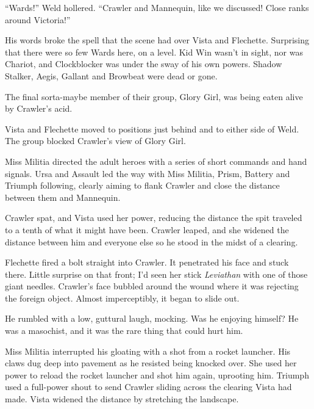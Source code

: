 





``Wards!''  Weld hollered.  ``Crawler and Mannequin, like we discussed!  Close ranks around Victoria!''



His words broke the spell that the scene had over Vista and Flechette.  Surprising that there were so few Wards here, on a level.  Kid Win wasn't in sight, nor was Chariot, and Clockblocker was under the sway of his own powers. Shadow Stalker, Aegis, Gallant and Browbeat were dead or gone.



The final sorta-maybe member of their group, Glory Girl, was being eaten alive by Crawler's acid.



Vista and Flechette moved to positions just behind and to either side of Weld.  The group blocked Crawler's view of Glory Girl.



Miss Militia directed the adult heroes with a series of short commands and hand signals.  Ursa and Assault led the way with Miss Militia, Prism, Battery and Triumph following, clearly aiming to flank Crawler and close the distance between them and Mannequin.



Crawler spat, and Vista used her power, reducing the distance the spit traveled to a tenth of what it might have been.  Crawler leaped, and she widened the distance between him and everyone else so he stood in the midst of a clearing.



Flechette fired a bolt straight into Crawler.  It penetrated his face and stuck there.  Little surprise on that front; I'd seen her stick \emph{Leviathan} with one of those giant needles.  Crawler's face bubbled around the wound where it was rejecting the foreign object.  Almost imperceptibly, it began to slide out.



He rumbled with a low, guttural laugh, mocking.  Was he enjoying himself?  He was a masochist, and it was the rare thing that could hurt him.



Miss Militia interrupted his gloating with a shot from a rocket launcher.  His claws dug deep into pavement as he resisted being knocked over.  She used her power to reload the rocket launcher and shot him again, uprooting him.  Triumph used a full-power shout to send Crawler sliding across the clearing Vista had made.  Vista widened the distance by stretching the landscape.



